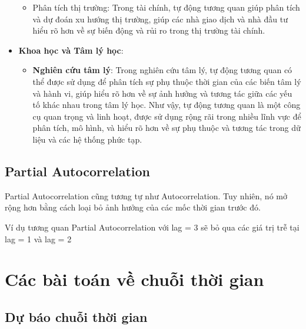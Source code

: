 \documentclass[
]{book}
\providecommand{\tightlist}{%
  \setlength{\itemsep}{0pt}\setlength{\parskip}{0pt}}
\begin{document}
\begin{itemize}
  \begin{itemize}
  \tightlist
  \item
    Phân tích thị trường: Trong tài chính, tự động tương quan giúp phân tích và dự đoán xu hướng thị trường, giúp các nhà giao dịch và nhà đầu tư hiểu rõ hơn về sự biến động và rủi ro trong thị trường tài chính.
  \end{itemize}
\item
  \textbf{Khoa học và Tâm lý học}:

  \begin{itemize}
  \tightlist
  \item
    \textbf{Nghiên cứu tâm lý}: Trong nghiên cứu tâm lý, tự động tương quan có thể được sử dụng để phân tích sự phụ thuộc thời gian của các biến tâm lý và hành vi, giúp hiểu rõ hơn về sự ảnh hưởng và tương tác giữa các yếu tố khác nhau trong tâm lý học.
    Như vậy, tự động tương quan là một công cụ quan trọng và linh hoạt, được sử dụng rộng rãi trong nhiều lĩnh vực để phân tích, mô hình, và hiểu rõ hơn về sự phụ thuộc và tương tác trong dữ liệu và các hệ thống phức tạp.
  \end{itemize}
\end{itemize}

\hypertarget{partial-autocorrelation}{%
\subsection{Partial Autocorrelation}\label{partial-autocorrelation}}

Partial Autocorrelation cũng tương tự như Autocorrelation. Tuy nhiên, nó mở rộng hơn bằng cách loại bỏ ảnh hưởng của các mốc thời gian trước đó.

Ví dụ tương quan Partial Autocorrelation với lag = 3 sẽ bỏ qua các giá trị trễ tại lag = 1 và lag = 2

\hypertarget{cuxe1c-buxe0i-touxe1n-vux1ec1-chuux1ed7i-thux1eddi-gian}{%
\section{Các bài toán về chuỗi thời gian}\label{cuxe1c-buxe0i-touxe1n-vux1ec1-chuux1ed7i-thux1eddi-gian}}

\hypertarget{dux1b0-bao-chuuxf4i-thux1a1i-gian}{%
\subsection{Dự báo chuỗi thời gian}\label{dux1b0-bao-chuuxf4i-thux1a1i-gian}}
\end{document}
